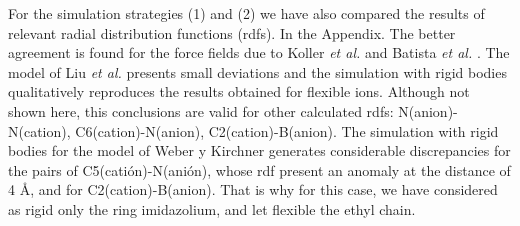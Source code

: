 \documentclass[3p,twocolumn]{elsarticle}
\begin{document}
For the simulation strategies (1) and (2) we have also compared the results of relevant radial distribution functions (rdfs). In the Appendix. The better agreement is found for the force fields due to Koller \textit{et al.} \cite{Koller_2012} and Batista \textit{et al.} \cite{Batista_2015}. The model of Liu \textit{et al.} \cite{Liu_2014} presents small deviations and the simulation with rigid bodies qualitatively reproduces the results obtained for flexible ions. Although not shown here, this conclusions are valid for other calculated rdfs:  N(anion)-N(cation), C6(cation)-N(anion), C2(cation)-B(anion). The simulation with rigid bodies for the model of Weber y Kirchner\cite{Weber_2016} generates considerable discrepancies for the pairs of C5(catión)-N(anión), whose rdf present an anomaly at the distance of 4 {\AA}, and for C2(cation)-B(anion). That is why for this case, we have considered as rigid only the ring imidazolium, and let flexible the ethyl chain.
\end{document}
